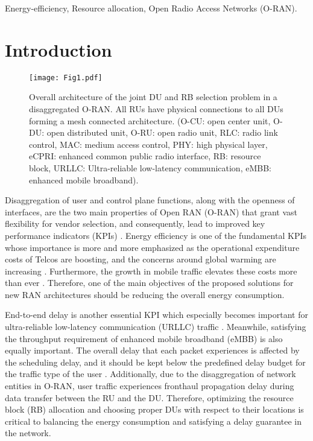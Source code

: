 \documentclass[conference]{IEEEtran}
\begin{document}
\begin{IEEEkeywords}
Energy-efficiency, Resource allocation, Open Radio Access Networks (O-RAN).
\end{IEEEkeywords}

\section{Introduction}
\begin{figure*}[t]
\centering
\texttt{[image: Fig1.pdf]}
\caption{\label{fig:arch} Overall architecture of the joint DU and RB selection problem in a disaggregated O-RAN. All RUs have physical connections to all DUs forming a mesh connected architecture. (O-CU: open center unit, O-DU: open distributed unit, O-RU: open radio unit, RLC: radio link control, MAC: medium access control, PHY: high physical layer, eCPRI: enhanced common public radio interface, RB: resource block, URLLC: Ultra-reliable low-latency communication, eMBB: enhanced mobile broadband).}
\end{figure*}

\par Disaggregation of user and control plane functions, along with the openness of interfaces, are the two main properties of Open RAN (O-RAN) that grant vast flexibility for vendor selection, and consequently, lead to improved key performance indicators (KPIs) \cite{O-RANAlliance2020}. Energy efficiency is one of the fundamental KPIs whose importance is more and more emphasized as the operational expenditure costs of Telcos are boosting, and the concerns around global warming are increasing \cite{Pamuklu2020}. Furthermore, the growth in mobile traffic elevates these costs more than ever \cite{Pawar2020}. Therefore, one of the main objectives of the proposed solutions for new RAN architectures should be reducing the overall energy consumption.
\par End-to-end delay is another essential KPI which especially becomes important for ultra-reliable low-latency communication (URLLC) traffic \cite{Elsayed2019}.  Meanwhile, satisfying the throughput requirement of enhanced mobile broadband (eMBB) is also equally important. The overall delay that each packet experiences is affected by the scheduling delay, and it should be kept below the predefined delay budget for the traffic type of the user \cite{Mollahasani2021}. Additionally, due to the disaggregation of network entities in O-RAN, user traffic experiences fronthaul propagation delay during data transfer between the RU and the DU. Therefore, optimizing the resource block (RB) allocation and choosing proper DUs with respect to their locations is critical to balancing the energy consumption and satisfying a delay guarantee in the network.
\end{document}
